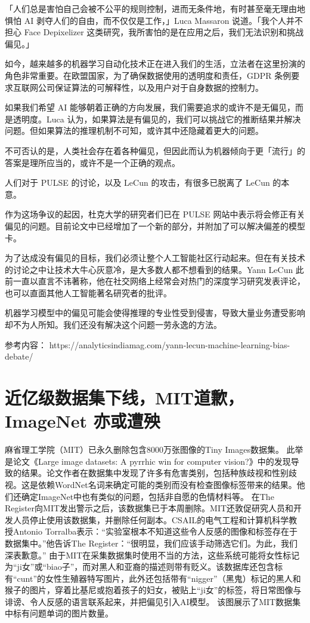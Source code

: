 「人们总是害怕自己会被不公平的规则控制，进而无条件地，有时甚至毫无理由地惧怕 AI 剥夺人们的自由，而不仅仅是工作，」Luca Massaron 说道。「我个人并不担心 Face Depixelizer 这类研究，我所害怕的是在应用之后，我们无法识别和挑战偏见。」




如今，越来越多的机器学习自动化技术正在进入我们的生活，立法者在这里扮演的角色非常重要。在欧盟国家，为了确保数据使用的透明度和责任，GDPR 条例要求互联网公司保证算法的可解释性，以及用户对于自身数据的控制力。

如果我们希望 AI 能够朝着正确的方向发展，我们需要追求的或许不是无偏见，而是透明度。Luca 认为，如果算法是有偏见的，我们可以挑战它的推断结果并解决问题。但如果算法的推理机制不可知，或许其中还隐藏着更大的问题。




不可否认的是，人类社会存在着各种偏见，但因此而认为机器倾向于更「流行」的答案是理所应当的，或许不是一个正确的观点。



人们对于 PULSE 的讨论，以及 LeCun 的攻击，有很多已脱离了 LeCun 的本意。

作为这场争议的起因，杜克大学的研究者们已在 PULSE 网站中表示将会修正有关偏见的问题。目前论文中已经增加了一个新的部分，并附加了可以解决偏差的模型卡。

为了达成没有偏见的目标，我们必须让整个人工智能社区行动起来。但在有关技术的讨论之中让技术大牛心灰意冷，是大多数人都不想看到的结果。Yann LeCun 此前一直以直言不讳著称，他在社交网络上经常会对热门的深度学习研究发表评论，也可以直面其他人工智能著名研究者的批评。

机器学习模型中的偏见可能会使得推理的专业性受到侵害，导致大量业务遭受影响却不为人所知。我们还没有解决这个问题一劳永逸的方法。

参考内容：
https://analyticsindiamag.com/yann-lecun-machine-learning-bias-debate/


\section{近亿级数据集下线，MIT道歉，ImageNet 亦或遭殃}

麻省理工学院（MIT）已永久删除包含8000万张图像的Tiny Images数据集。
此举是论文《Large image datasets: A pyrrhic win for computer vision?》中的发现导致的结果。论文作者在数据集中发现了许多有危害类别，包括种族歧视和性别歧视。这是依赖WordNet名词来确定可能的类别而没有检查图像标签带来的结果。他们还确定ImageNet中也有类似的问题，包括非自愿的色情材料等。
在The Register向MIT发出警示之后，该数据集已于本周删除。MIT还敦促研究人员和开发人员停止使用该数据集，并删除任何副本。CSAIL的电气工程和计算机科学教授Antonio Torralba表示：“实验室根本不知道这些令人反感的图像和标签存在于数据集中。”他告诉The Register：“很明显，我们应该手动筛选它们。为此，我们深表歉意。”
由于MIT在采集数据集时使用不当的方法，这些系统可能将女性标记为“ji女”或“biao子”，而对黑人和亚裔的描述则带有贬义。该数据库还包含标有“cunt”的女性生殖器特写图片，此外还包括带有“nigger”（黑鬼）标记的黑人和猴子的图片，穿着比基尼或抱着孩子的妇女，被贴上“ji女”的标签，将日常图像与诽谤、令人反感的语言联系起来，并把偏见引入AI模型。      
       该图展示了MIT数据集中标有问题单词的图片数量。

